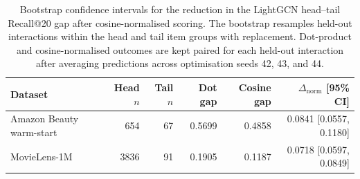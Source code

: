 \begin{table}[htbp]
\centering
\small
\begin{tabular}{lrrrrr}
\hline
Dataset & Head $n$ & Tail $n$ & Dot gap & Cosine gap & $\Delta_{\mathrm{norm}}$ [95\% CI] \\
\hline
Amazon Beauty warm-start & 654 & 67 & 0.5699 & 0.4858 & 0.0841 [0.0557, 0.1180] \\
MovieLens-1M & 3836 & 91 & 0.1905 & 0.1187 & 0.0718 [0.0597, 0.0849] \\
\hline
\end{tabular}
\caption{Bootstrap confidence intervals for the reduction in the LightGCN head--tail Recall@20 gap after cosine-normalised scoring. The bootstrap resamples held-out interactions within the head and tail item groups with replacement. Dot-product and cosine-normalised outcomes are kept paired for each held-out interaction after averaging predictions across optimisation seeds 42, 43, and 44.}
\label{tab:cosine_gap_bootstrap_ci}
\end{table}
